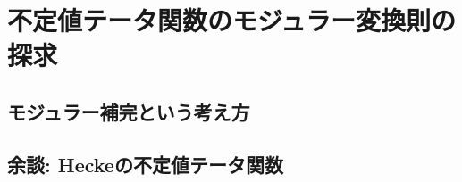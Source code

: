\documentclass[11pt,b5paper,oneside,lualatex]{ltjsarticle} %
\numberwithin{equation}{section} %
\begin{document}

\section{不定値テータ関数のモジュラー変換則の探求} \label{sec:indefinite_theta}








\subsection{モジュラー補完という考え方} \label{subsec:modular_completion}










\subsection{} \label{subsec:}
















\subsection{余談: Heckeの不定値テータ関数} \label{subsec:Hecke_theta}

\end{document}
